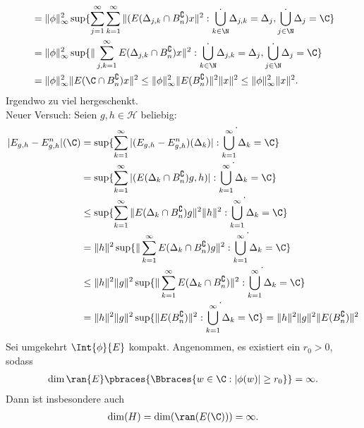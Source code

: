 \begin{solution}
\begin{align*}
  &= \|\phi\|_{\infty}^2 \sup\{\sum_{j=1}^{\infty}\sum_{k=1}^{\infty}
  \|(E(\Delta_{j,k}\cap B_n^{\complement})x\|^2: \dot{\bigcup_{k \in \N}}\Delta_{j,k} = \Delta_j, \dot{\bigcup_{j \in \N}}\Delta_j = \C\} \\
  &= \|\phi\|_{\infty}^2 \sup\{\|\sum_{j,k=1}^{\infty}
  E(\Delta_{j,k}\cap B_n^{\complement})x\|^2: \dot{\bigcup_{k \in \N}}\Delta_{j,k} = \Delta_j, \dot{\bigcup_{j \in \N}}\Delta_j = \C\} \\
  &= \|\phi\|_{\infty}^2 \|E(\C \cap B_n^{\complement})x\|^2
  \leq \|\phi\|_{\infty}^2 \|E(B_n^{\complement})\|^2 \|x\|^2 \leq \|\phi\|_{\infty}^2\|x\|^2.
\end{align*}
Irgendwo zu viel hergeschenkt. \\
Neuer Versuch: Seien $g,h \in \mathcal{H}$ beliebig:
\begin{align*}
|E_{g,h} - E_{g,h}^n|(\C) &=
\sup\{\sum_{k=1}^\infty|(E_{g,h} - E_{g,h}^n)(\Delta_k)|:
\dot{\bigcup_{k=1}^{\infty}\Delta_k} = \C\} \\
&= \sup\{\sum_{k=1}^\infty|(E(\Delta_k \cap B_n^{\complement})g,h)|:
\dot{\bigcup_{k=1}^{\infty}\Delta_k} = \C\} \\
&\leq \sup\{\sum_{k=1}^\infty\|E(\Delta_k \cap B_n^{\complement})g\|^2\|h\|^2:
\dot{\bigcup_{k=1}^{\infty}\Delta_k} = \C\} \\
&= \|h\|^2\sup\{\|\sum_{k=1}^\infty E(\Delta_k \cap B_n^{\complement})g\|^2:
\dot{\bigcup_{k=1}^{\infty}\Delta_k} = \C\} \\
&\leq \|h\|^2\|g\|^2\sup\{\|\sum_{k=1}^\infty E(\Delta_k \cap B_n^{\complement})\|^2:
\dot{\bigcup_{k=1}^{\infty}\Delta_k} = \C\} \\
&= \|h\|^2\|g\|^2\sup\{\|E(B_n^{\complement})\|^2:
\dot{\bigcup_{k=1}^{\infty}\Delta_k} = \C\} = \|h\|^2\|g\|^2\|E(B_n^{\complement})\|^2
\end{align*}
Sei umgekehrt $\Int{\phi}{E}$ kompakt. Angenommen, es existiert ein $r_0 > 0$,
sodass
\begin{align*}
  \dim{\ran{E}}\pbraces{\Bbraces{w \in \C:|\phi(w)| \geq r_0}} = \infty.
\end{align*}
Dann ist insbesondere auch
\begin{align*}
  \dim(H) = \dim(\ran(E(\C))) = \infty.
\end{align*}
\end{solution}

